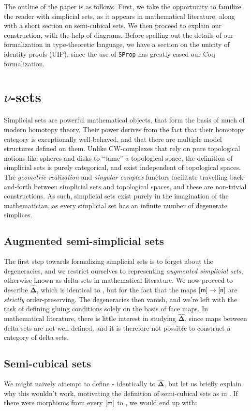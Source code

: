 \documentclass[10pt]{art}
\newcommand{\DeltaHat}{\ensuremath{\hat{\boldsymbol{\Delta}}}}
\newcommand{\Cube}[1]{\ensuremath{\boldsymbol{\square^{#1}}}}
\begin{document}
The outline of the paper is as follows. First, we take the opportunity to familize the reader with simplicial sets, as it appears in mathematical literature, along with a short section on semi-cubical sets. We then proceed to explain our construction, with the help of diagrams. Before spelling out the details of our formalization in type-theoretic language, we have a section on the unicity of identity proofs (UIP), since the use of \texttt{SProp} has greatly eased our Coq formalization.

\section{\texorpdfstring{$\nu$}{nu}-sets}
Simplicial sets are powerful mathematical objects, that form the basis of much of modern homotopy theory. Their power derives from the fact that their homotopy category is exceptionally well-behaved, and that there are multiple model structures defined on them. Unlike CW-complexes that rely on pure topological notions like spheres and disks to ``tame'' a topological space, the definition of simplicial sets is purely categorical, and exist independent of topological spaces. The \emph{geometric realization} and \emph{singular complex} functors facilitate travelling back-and-forth between simplicial sets and topological spaces, and these are non-trivial constructions. As such, simplicial sets exist purely in the imagination of the mathematician, as every simplicial set has an infinite number of degenerate simplices.

\subsection{Augmented semi-simplicial sets}
The first step towards formalizing simplicial sets is to forget about the degeneracies, and we restrict ourselves to representing \emph{augmented simplicial sets}, otherwise known as delta-sets in mathematical literature. We now proceed to describe \DeltaHat, which is identical to \Simplex{}, but for the fact that the maps $\mathsf{[m]} \rightarrow \mathsf{[n]}$ are \emph{strictly} order-preserving. The degeneracies then vanish, and we're left with the task of defining gluing conditions solely on the basis of face maps. In mathematical literature, there is little interest in studying \DeltaHat, since maps between delta sets are not well-defined, and it is therefore not possible to construct a category of delta sets.

\subsection{Semi-cubical sets}
We might naively attempt to define $\Cube{}$ identically to \DeltaHat, but let us briefly explain why this wouldn't work, motivating the definition of semi-cubical sets as in \cite{Antolini00}. If there were morphisms from every $\mathsf{[m]}$ to , we would end up with:
\end{document}
